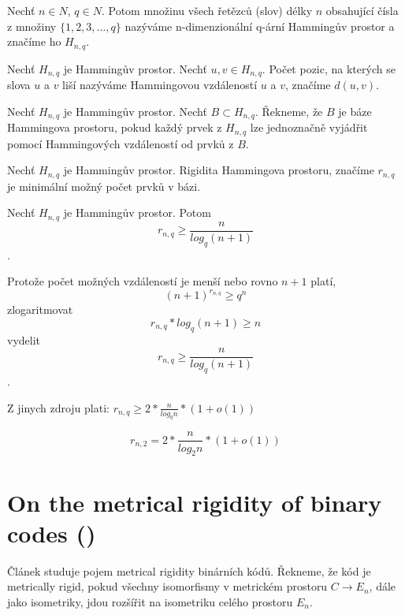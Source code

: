 \begin{definice}\label{def01:1}
  Nechť $n \in N$, $q \in N$. Potom množinu všech řetězců (slov) délky $n$ obsahující čísla z množiny $\{1, 2, 3, \dots, q\}$ nazýváme n-dimenzionální q-ární Hammingův prostor a značíme ho $H_{n,q}$.
\end{definice}

\begin{definice}\label{def01:1}
  Nechť $H_{n,q}$ je Hammingův prostor. Nechť $u,v \in H_{n,q}$. Počet pozic, na kterých se slova $u$ a $v$ liší nazýváme Hammingovou vzdáleností $u$ a $v$, značíme $d(u,v)$.
\end{definice}

\begin{definice}\label{def01:1}
  Nechť $H_{n,q}$ je Hammingův prostor. Nechť $B \subset H_{n,q}$. Řekneme, že $B$ je báze Hammingova prostoru, pokud každý prvek z $H_{n,q}$ lze jednoznačně vyjádřit pomocí Hammingových vzdáleností od prvků z $B$.
  \end{definice}

\begin{definice}\label{def01:1}
  Nechť $H_{n,q}$ je Hammingův prostor. Rigidita Hammingova prostoru, značíme $r_{n,q}$ je minimální možný počet prvků v bázi.
\end{definice}

\begin{veta}\label{veta01:1}
  Nechť $H_{n,q}$ je Hammingův prostor. Potom \[r_{n,q} \geq \frac{n}{log_q(n+1)}\].
\end{veta}

\begin{dukaz}
  Protože počet možných vzdáleností je menší nebo rovno $n+1$ platí, 
  \[(n+1)^{r_{n,q}} \geq q^n\]
  zlogaritmovat
  \[r_{n,q}*log_q(n+1) \geq n\]
  vydelit
  \[r_{n,q} \geq \frac{n}{log_q(n+1)}\].
\end{dukaz}


Z jinych zdroju plati:
$r_{n,q} \geq 2* \frac{n}{log_qn} * (1+o(1))$ 

\[r_{n,2} = 2* \frac{n}{log_2 n} * (1+o(1))\] 



\section{On the metrical rigidity of binary codes () \cite{AVGUSTINOVICH2001444}}
Článek studuje pojem metrical rigidity binárních kódů. Řekneme, že kód je metrically rigid, pokud všechny isomorfismy v metrickém prostoru $C \to E_n$, dále jako isometriky, jdou rozšířit na isometriku celého prostoru $E_n$. 

